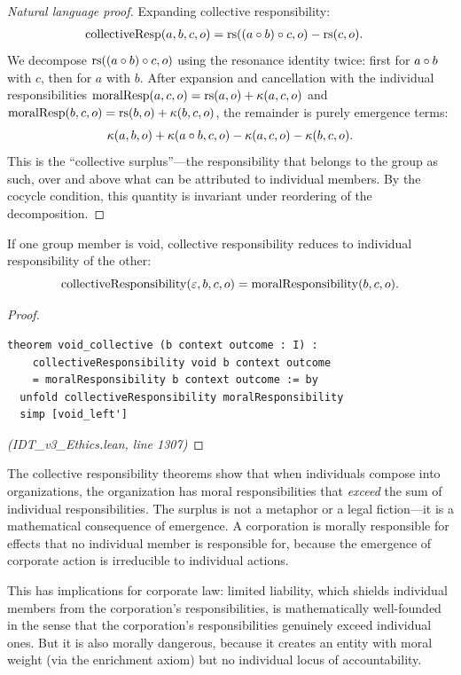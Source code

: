 \begin{proof}[Natural language proof]
Expanding collective responsibility:
\begin{align*}
  \mathrm{collectiveResp}(a, b, c, o) &= \mathrm{rs}((a \circ b) \circ c, o) - \mathrm{rs}(c, o).
\end{align*}
We decompose $\mathrm{rs}((a \circ b) \circ c, o)$ using the resonance identity
twice: first for $a \circ b$ with $c$, then for $a$ with $b$.
After expansion and cancellation with the individual responsibilities
$\mathrm{moralResp}(a, c, o) = \mathrm{rs}(a, o) + \kappa(a, c, o)$ and
$\mathrm{moralResp}(b, c, o) = \mathrm{rs}(b, o) + \kappa(b, c, o)$,
the remainder is purely emergence terms:
\[
  \kappa(a, b, o)
  + \kappa(a \circ b, c, o)
  - \kappa(a, c, o) - \kappa(b, c, o).
\]
This is the ``collective surplus''---the responsibility that belongs to
the group as such, over and above what can be attributed to individual
members. By the cocycle condition, this quantity is invariant under
reordering of the decomposition.
\end{proof}

\begin{theorem}
\label{thm:void-collective}
If one group member is void, collective responsibility reduces to
individual responsibility of the other:
\[
  \mathrm{collectiveResponsibility}(\varepsilon, b, c, o) = \mathrm{moralResponsibility}(b, c, o).
\]
\end{theorem}

\begin{proof}
\begin{lstlisting}
theorem void_collective (b context outcome : I) :
    collectiveResponsibility void b context outcome
    = moralResponsibility b context outcome := by
  unfold collectiveResponsibility moralResponsibility
  simp [void_left']
\end{lstlisting}
\textit{(IDT\_v3\_Ethics.lean, line 1307)}
\end{proof}

\begin{interpretation}
The collective responsibility theorems show that when individuals compose
into organizations, the organization has moral responsibilities that
\emph{exceed} the sum of individual responsibilities. The surplus is not
a metaphor or a legal fiction---it is a mathematical consequence of
emergence. A corporation is morally responsible for effects that no
individual member is responsible for, because the emergence of
corporate action is irreducible to individual actions.

This has implications for corporate law: limited liability, which shields
individual members from the corporation's responsibilities, is
mathematically well-founded in the sense that the corporation's
responsibilities genuinely exceed individual ones. But it is also
morally dangerous, because it creates an entity with moral weight
(via the enrichment axiom) but no individual locus of accountability.
\end{interpretation}

